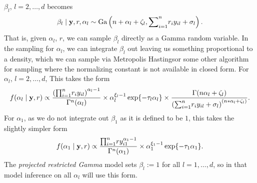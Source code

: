   $\beta_l$, $l = 2,\ldots,d$ becomes
  \begin{equation}
    \label{eqn:betafc}
    \beta_l\mid {\bf y}, r, \alpha_l \sim \text{Ga}\left(n + \alpha_l + \zeta_l,
                                      {\small \sum}_{i = 1}^nr_iy_{il} + \sigma_l\right).
  \end{equation}
  That is, given $\alpha_l$, $r$, we can sample $\beta_l$ directly as a Gamma random variable.  In
  the sampling for $\alpha_l$, we can integrate $\beta_l$ out leaving us something proportional
  to a density, which we can sample via Metropolis Hastings\findcite or some other algorithm for
  sampling where the normalizing constant is not available in closed form.  For $\alpha_l$,
  $l = 2,\ldots, d$, This takes the form
  \begin{equation}
    \label{eqn:alphafc}
    f(\alpha_l \mid {\bf y}, r) \propto
    \frac{\left({\small \prod}_{i = 1}^nr_iy_{il}\right)^{\alpha_l - 1}}{\Gamma^n(\alpha_l)} \times
    \alpha_l^{\xi_l - 1}\exp\{-\tau_l\alpha_l\} \times
    \frac{\Gamma(n\alpha_l + \zeta_l)}{
        \left({\small\sum}_{i = 1}^n r_iy_{il} + \sigma_l\right)^{(n * \alpha_l + \zeta_l)}}.
  \end{equation}
  For $\alpha_1$, as we do not integrate out $\beta_1$ as it is defined to be $1$, this takes the
  slightly simpler form
  \begin{equation}
    \label{eqn:alphafc1}
    f(\alpha_1 \mid {\bf y}, r) \propto
      \frac{{\small\prod}_{i = 1}^n ry_{i1}^{\alpha_1 - 1}}{\Gamma^n(\alpha_1)} \times
      \alpha_1^{\xi_1 - 1}\exp\{-\tau_1\alpha_1\}.
  \end{equation}
  The \emph{projected restricted Gamma} model sets $\beta_l := 1$ for all $l = 1,\ldots,d$, so in that
  model inference on all $\alpha_l$ will use this form.

